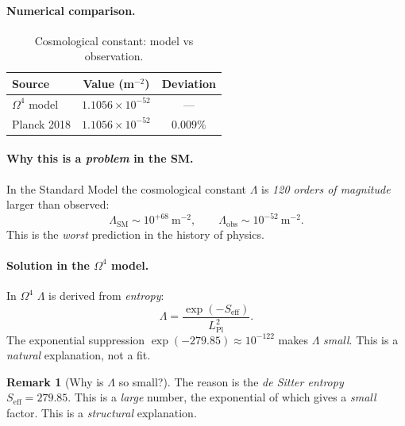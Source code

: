 \documentclass[11pt,a4paper]{article}
\newcommand{\Om}{\Omega^4}
\theoremstyle{definition}
\newtheorem{remark}[theorem]{Remark}
\begin{document}
\paragraph{Numerical comparison.}
\begin{table}[htbp]
\centering
\caption{Cosmological constant: model vs observation.}
\label{tab:lambda-comparison-cosmo}
\begin{tabular}{lcc}
\toprule
Source & Value (m$^{-2}$) & Deviation \\ 
\midrule
$\Om$ model & $1.1056 \times 10^{-52}$ & --- \\[0.3em]
Planck 2018 & $1.1056 \times 10^{-52}$ & $0.009\%$ \\ 
\bottomrule
\end{tabular}
\end{table}

\paragraph{Why this is a \emph{problem} in the SM.}
In the Standard Model the cosmological constant $\Lambda$ 
is \emph{120 orders of magnitude} larger than observed:
\begin{equation}
    \Lambda_{\text{SM}} \sim 10^{+68}~\text{m}^{-2}, 
    \qquad \Lambda_{\text{obs}} \sim 10^{-52}~\text{m}^{-2}.
\end{equation}
This is the \emph{worst} prediction in the history of physics.

\paragraph{Solution in the $\Om$ model.}
In $\Om$ $\Lambda$ is derived from \emph{entropy}:
\begin{equation}
    \Lambda = \frac{\exp(-S_{\text{eff}})}{L_{\text{Pl}}^2}.
\end{equation}
The exponential suppression $\exp(-279.85) \approx 10^{-122}$ 
makes $\Lambda$ \emph{small}. This is a \emph{natural} 
explanation, not a fit.

\begin{remark}[Why is $\Lambda$ so small?]
\label{rem:why-lambda-small}
The reason is the \emph{de Sitter entropy} $S_{\text{eff}} = 279.85$. 
This is a \emph{large} number, the exponential of which gives 
a \emph{small} factor. This is a \emph{structural} explanation.
\end{remark}

\end{document}
